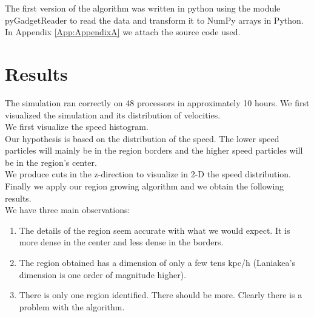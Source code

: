 \documentclass[12pt]{article}
\begin{document}
The first version of the algorithm was written in python using the module
pyGadgetReader \cite{thompson_pygadgetreader_2014ascl_soft11001T} to read the
data and transform it to NumPy arrays in Python. In Appendix \ref{App:AppendixA} we attach the source code used.


\section{Results}

The simulation ran correctly on 48 processors in approximately 10 hours. We first visualized the simulation and its distribution of velocities. \\

We first visualize the speed histogram.\\


Our hypothesis is based on the distribution of the speed. The lower speed
particles will mainly be in the region borders and the higher speed particles
will be in the region's center. \\


We produce cuts in the z-direction to visualize in 2-D the speed distribution. \\



Finally we apply our region growing algorithm and we obtain the following results.\\


We have three main observations:\\
\begin{enumerate}
	\item The details of the region seem accurate with what we would expect. It is more dense in the center and less dense in the borders.
	\item The region obtained has a dimension of only a few tens kpc/h (Laniakea's dimension is one order of magnitude higher).
    \item There is only one region identified. There should be more. Clearly there is a problem with the algorithm.
\end{enumerate}
\end{document}
